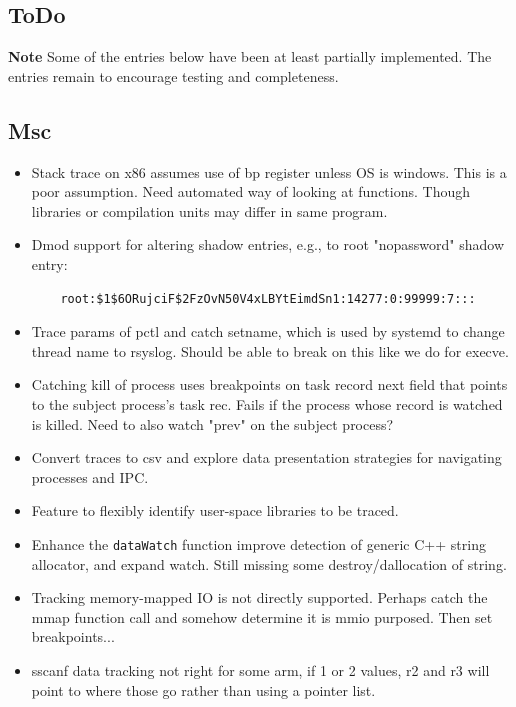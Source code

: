 \documentclass[titlepage]{article}
\begin{document}
\begin{appendices}
\section{ToDo}
\textbf{Note} Some of the entries below have been at least partially implemented.  The entries remain to encourage testing and completeness.
\subsection {Msc}
\begin{itemize}
\item Stack trace on x86 assumes use of bp register unless OS is windows.  This is a poor assumption.  Need automated way
of looking at functions.  Though libraries or compilation units may differ in same program.

\item Dmod support for altering shadow entries, e.g., to root "nopassword" shadow entry:
\begin{verbatim}
    root:$1$6ORujciF$2FzOvN50V4xLBYtEimdSn1:14277:0:99999:7:::
\end{verbatim}

\item Trace params of pctl and catch setname, which is used by systemd to change thread name to rsyslog.  Should be able to 
break on this like we do for execve.

\item Catching kill of process uses breakpoints on task record next field that points to the subject process's task rec.  Fails if the
process whose record is watched is killed.  Need to also watch "prev" on the subject process?

\item Convert traces to csv and explore data presentation strategies for navigating processes and IPC.

\item Feature to flexibly identify user-space libraries to be traced.

\item Enhance the {\tt dataWatch} function improve detection of generic C++ string allocator, and expand watch.  Still missing some destroy/dallocation
of string.

\item Tracking memory-mapped IO is not directly supported.  Perhaps catch the mmap function call and somehow determine it is mmio purposed.  Then
set breakpoints...

\item sscanf data tracking not right for some arm, if 1 or 2 values, r2 and r3 will point to where those go rather than using a pointer list.


\end{itemize}
\end{appendices}
\end{document}
